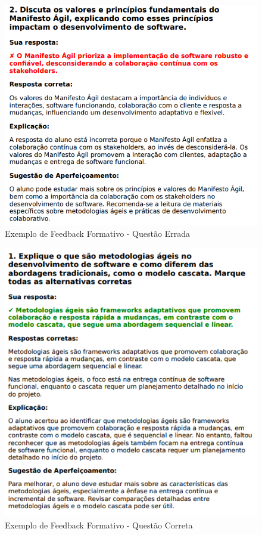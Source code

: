 \begin{figure}[H]
    \centering
    \includegraphics[width=1\textwidth]{figuras/feedback-example1.png}
    \caption{Exemplo de Feedback Formativo - Questão Errada}
    \label{fig:feedback_example1}
\end{figure}

\begin{figure}[H]
    \centering
    \includegraphics[width=1\textwidth]{figuras/feedback-example2.png}
    \caption{Exemplo de Feedback Formativo - Questão Correta}
    \label{fig:feedback_example2}
\end{figure}

